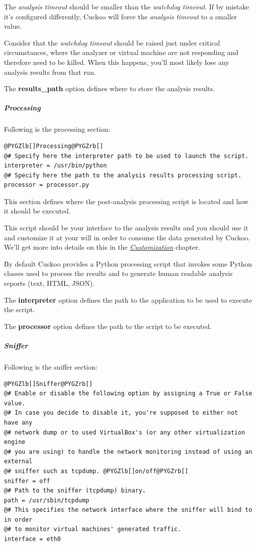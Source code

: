 \documentclass[letterpaper,10pt,english]{sphinxmanual}
\begin{document}
The \emph{analysis timeout} should be smaller than the \emph{watchdog timeout}. If by
mistake it's configured differently, Cuckoo will force the \emph{analysis timeout}
to a smaller value.

Consider that the \emph{watchdog timeout} should be raised just under critical
circumstances, where the analyzer or virtual machine are not responding and
therefore need to be killed. When this happens, you'll most likely lose any
analysis results from that run.

The \textbf{results\_path} option defines where to store the analysis results.


\subparagraph{Processing}
\label{installation/host/configuration:processing}
Following is the processing section:

\begin{Verbatim}[commandchars=@\[\]]
@PYGZlb[]Processing@PYGZrb[]
@# Specify here the interpreter path to be used to launch the script.
interpreter = /usr/bin/python
@# Specify here the path to the analysis results processing script.
processor = processor.py
\end{Verbatim}

This section defines where the post-analysis processing script is located and
how it should be executed.

This script should be your interface to the analysis results and you should
use it and customize it at your will in order to consume the data generated by
Cuckoo. We'll get more into details on this in the {\hyperref[customization/index::doc]{\emph{Customization}}}
chapter.

By default Cuckoo provides a Python processing script that invokes some Python
classes used to process the results and to generate human readable analysis
reports (text, HTML, JSON).

The \textbf{interpreter} option defines the path to the application to be used to
execute the script.

The \textbf{processor} option defines the path to the script to be executed.


\subparagraph{Sniffer}
\label{installation/host/configuration:sniffer}
Following is the sniffer section:

\begin{Verbatim}[commandchars=@\[\]]
@PYGZlb[]Sniffer@PYGZrb[]
@# Enable or disable the following option by assigning a True or False value.
@# In case you decide to disable it, you're supposed to either not have any
@# network dump or to used VirtualBox's (or any other virtualization engine
@# you are using) to handle the network monitoring instead of using an external
@# sniffer such as tcpdump. @PYGZlb[]on/off@PYGZrb[]
sniffer = off
@# Path to the sniffer (tcpdump) binary.
path = /usr/sbin/tcpdump
@# This specifies the network interface where the sniffer will bind to in order
@# to monitor virtual machines' generated traffic.
interface = eth0
\end{Verbatim}
\end{document}
